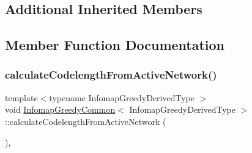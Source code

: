 \subsection*{Additional Inherited Members}


\subsection{Member Function Documentation}
\mbox{\label{classInfomapGreedyCommon_ae168ab41c18759e09b1a3dff97ee017d}} 
\subsubsection{\texorpdfstring{calculate\+Codelength\+From\+Active\+Network()}{calculateCodelengthFromActiveNetwork()}}
{\footnotesize\ttfamily template$<$typename Infomap\+Greedy\+Derived\+Type $>$ \\
void \mbox{\hyperlink{classInfomapGreedyCommon}{Infomap\+Greedy\+Common}}$<$ Infomap\+Greedy\+Derived\+Type $>$\+::calculate\+Codelength\+From\+Active\+Network (\begin{DoxyParamCaption}{ }\end{DoxyParamCaption})\hspace{0.3cm}{\ttfamily [protected]}, {\ttfamily [virtual]}}

